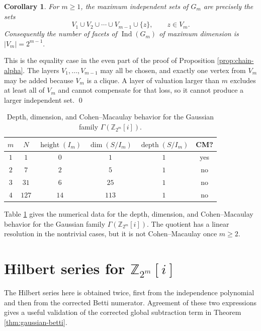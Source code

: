 \documentclass[12pt]{article}
\newtheorem{corollary}[theorem]{Corollary}
\theoremstyle{definition}
\renewenvironment{proof}{{\bf \noindent Proof.}}{\qed}
\begin{document}
\medskip

\begin{corollary}\label{cor:gaussian-facets}
	For $m\geq 1$, the maximum independent sets of $G_m$ are precisely the sets
	$$
	V_1\cup V_2\cup\cdots\cup V_{m-1}\cup\{z\},\qquad z\in V_m.
	$$
	Consequently the number of facets of $\operatorname{Ind}(G_m)$ of maximum dimension is
	$ |V_m|=2^{m-1}. $
\end{corollary}

\begin{proof}
	This is the equality case in the even part of the proof of Proposition \ref{prop:chain-alpha}.  The layers $V_1,\ldots,V_{m-1}$ may all be chosen, and exactly one vertex from $V_m$ may be added because $V_m$ is a clique.  A layer of valuation larger than $m$ excludes at least all of $V_m$ and cannot compensate for that loss, so it cannot produce a larger independent set.
\end{proof}

\medskip

\begin{table}[H]
	\centering
	\begin{tabular}{c c c c c c}
		\toprule
		$m$ & $N$ & $\operatorname{height}(I_m)$ & $\dim(S/I_m)$ & $\operatorname{depth}(S/I_m)$ & CM? \\
		\midrule
		$1$ & $1$ & $0$ & $1$ & $1$ & yes \\
		$2$ & $7$ & $2$ & $5$ & $1$ & no \\
		$3$ & $31$ & $6$ & $25$ & $1$ & no \\
		$4$ & $127$ & $14$ & $113$ & $1$ & no \\
		\bottomrule
	\end{tabular}
	\caption{Depth, dimension, and Cohen--Macaulay behavior for the Gaussian family $\Gamma(\mathbb{Z}_{2^m}[i])$.}
	\label{tab:gaussian-CM}
\end{table}
Table \ref{tab:gaussian-CM} gives the numerical data for the depth, dimension, and Cohen--Macaulay behavior for the Gaussian family $\Gamma(\mathbb{Z}_{2^m}[i])$.  The quotient has a linear resolution in the nontrivial cases, but it is not Cohen--Macaulay once $m\geq 2$.
\medskip

\section{Hilbert series for \texorpdfstring{$\mathbb{Z}_{2^m}[i]$}{Z_2^m[i]}}\label{sec:gaussian-hilbert}
 The Hilbert series here is obtained twice, first from the independence polynomial and then from the corrected Betti numerator.  Agreement of these two expressions gives a useful validation of the corrected global subtraction term in Theorem \ref{thm:gaussian-betti}.
\end{document}
